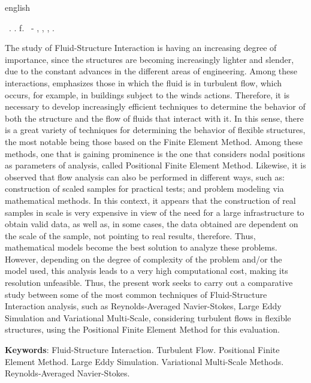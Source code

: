 \begin{resumo}[Abstract]
    \begin{otherlanguage*}{english}
        \begin{flushleft}
            \setlength{\absparsep}{0pt} %
            \SingleSpacing
            \Autorabr\ \textbf{\Title}.	\the\year. \pageref{LastPage}f.
            \Typeofwork\ - \Unidademin, \Universidade, \Local, \the\year.
        \end{flushleft}
        \OnehalfSpacing

        The study of Fluid-Structure Interaction is having an increasing degree of importance, since the structures are becoming increasingly lighter and slender, due to the constant advances in the different areas of engineering. Among these interactions, emphasizes those in which the fluid is in turbulent flow, which occurs, for example, in buildings subject to the winds actions. Therefore, it is necessary to develop increasingly efficient techniques to determine the behavior of both the structure and the flow of fluids that interact with it. In this sense, there is a great variety of techniques for determining the behavior of flexible structures, the most notable being those based on the Finite Element Method. Among these methods, one that is gaining prominence is the one that considers nodal positions as parameters of analysis, called Positional Finite Element Method. Likewise, it is observed that flow analysis can also be performed in different ways, such as: construction of scaled samples for practical tests; and problem modeling via mathematical methods. In this context, it appears that the construction of real samples in scale is very expensive in view of the need for a large infrastructure to obtain valid data, as well as, in some cases, the data obtained are dependent on the scale of the sample, not pointing to real results, therefore. Thus, mathematical models become the best solution to analyze these problems. However, depending on the degree of complexity of the problem and/or the model used, this analysis leads to a very high computational cost, making its resolution unfeasible. Thus, the present work seeks to carry out a comparative study between some of the most common techniques of Fluid-Structure Interaction analysis, such as Reynolds-Averaged Navier-Stokes, Large Eddy Simulation and Variational Multi-Scale, considering turbulent flows in flexible structures, using the Positional Finite Element Method for this evaluation.

        \textbf{Keywords}: Fluid-Structure Interaction. Turbulent Flow. Positional Finite Element Method. Large Eddy Simulation. Variational Multi-Scale Methods. Reynolds-Averaged Navier-Stokes.
    \end{otherlanguage*}
\end{resumo}